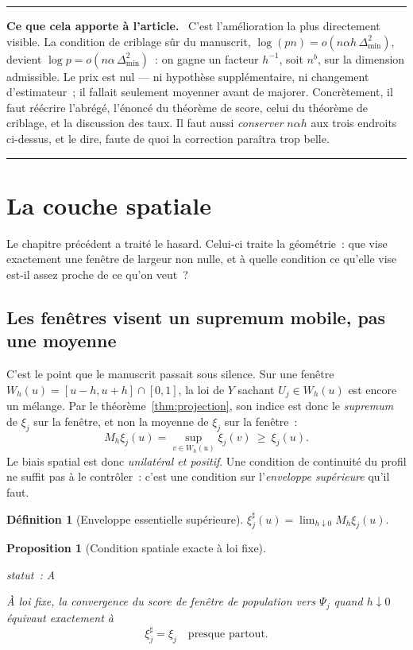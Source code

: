 \documentclass[11pt]{article}
\theoremstyle{plain}
\newtheorem{proposition}[theoreme]{Proposition}
\theoremstyle{definition}
\newtheorem{definition}[theoreme]{Définition}
\theoremstyle{remark}
\newcommand{\1}{\mathbf 1}
\newcommand{\statut}[1]{%
  \nopagebreak\par\nopagebreak
  \hfill{\normalfont\footnotesize\textcolor{gris}{statut~: #1}}%
  \par\nopagebreak\vspace{-2pt}}
\newenvironment{apport}
  {\par\medskip\noindent\begingroup\color{bleu}\rule{\linewidth}{0.6pt}\par
   \nobreak\vspace{2pt}\noindent\textbf{Ce que cela apporte à l'article.}\ \normalcolor}
  {\par\vspace{2pt}\noindent\textcolor{bleu}{\rule{\linewidth}{0.6pt}}\endgroup\par\medskip}
\begin{document}
\begin{apport}
C'est l'amélioration la plus directement visible. La condition de
criblage sûr du manuscrit,
$\log(pn)=o(n\alpha h\,\Delta_{\min}^2)$, devient
$\log p=o(n\alpha\,\Delta_{\min}^2)$~: on gagne un facteur $h^{-1}$, soit
$n^{b}$, sur la dimension admissible. Le prix est nul --- ni hypothèse
supplémentaire, ni changement d'estimateur~; il fallait seulement moyenner
avant de majorer. Concrètement, il faut réécrire l'abrégé, l'énoncé du
théorème de score, celui du théorème de criblage, et la discussion des
taux. Il faut aussi \emph{conserver} $n\alpha h$ aux trois endroits
ci-dessus, et le dire, faute de quoi la correction paraîtra trop belle.
\end{apport}

\clearpage

\section{La couche spatiale}\label{ch:spatial}

Le chapitre précédent a traité le hasard. Celui-ci traite la géométrie~:
que vise exactement une fenêtre de largeur non nulle, et à quelle
condition ce qu'elle vise est-il assez proche de ce qu'on veut~?

\subsection{Les fenêtres visent un supremum mobile, pas une moyenne}

C'est le point que le manuscrit passait sous silence. Sur une fenêtre
$W_h(u)=[u-h,u+h]\cap[0,1]$, la loi de $Y$ sachant $U_j\in W_h(u)$ est
encore un mélange. Par le théorème~\ref{thm:projection}, son indice est
donc le \emph{supremum} de $\xi_j$ sur la fenêtre, et non la moyenne de
$\xi_j$ sur la fenêtre~:
\[
 M_h\xi_j(u)=\sup_{v\in W_h(u)}\xi_j(v)\ \ge\ \xi_j(u).
\]
Le biais spatial est donc \emph{unilatéral et positif}. Une condition de
continuité du profil ne suffit pas à le contrôler~: c'est une condition
sur l'\emph{enveloppe supérieure} qu'il faut.

\begin{definition}[Enveloppe essentielle supérieure]
$\xi_j^\sharp(u)=\lim_{h\downarrow0}M_h\xi_j(u)$.
\end{definition}

\begin{proposition}[Condition spatiale exacte à loi fixe]
\label{prop:EUR}
\statut{A}
À loi fixe, la convergence du score de fenêtre de population vers
$\Psi_j$ quand $h\downarrow0$ équivaut \emph{exactement} à
\[
 \xi_j^\sharp=\xi_j\quad\text{presque partout.}
 \tag{EUR}
\]
\end{proposition}
\end{document}
